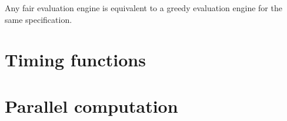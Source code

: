   \begin{theorem}[name = Equivalence of Fair and Greedy Evaluation Engines]\label{theorem:equivalence_greedy_fair_engines}
    Any fair evaluation engine is equivalent to a greedy evaluation engine for the same specification.
  \end{theorem}

  \section{Timing functions}
  \label{sec:behaviours:timing_functions}

  \section{Parallel computation}
